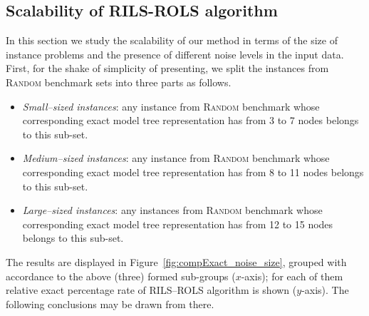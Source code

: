 \documentclass[a4paper,12pt]{elsarticle}
\begin{document}
\subsection{Scalability of \textsc{RILS}-\textsc{ROLS} algorithm}\label{sec:scalability-rils-rols}

In this section we study the scalability of our method in terms of the size of  instance problems and  the presence of different noise levels in the input data.  First, for the shake of simplicity of presenting,  we split the instances from \textsc{Random} benchmark sets into three parts as follows. 
\begin{itemize}
	\item \textit{Small--sized instances}: any instance  from \textsc{Random} benchmark whose   corresponding exact model  tree representation  has from 3 to 7 nodes belongs to this sub-set.
	\item \textit{Medium--sized instances}:  any instance  from \textsc{Random} benchmark whose   corresponding exact model tree representation  has from 8 to 11 nodes belongs to this sub-set.
	\item \textit{Large--sized instances}: any instances from \textsc{Random} benchmark whose   corresponding exact model  tree representation  has from 12 to 15 nodes belongs to this sub-set. 
\end{itemize}

The results are displayed in Figure~\ref{fig:compExact_noise_size}, grouped with accordance to the above (three) formed sub-groups ($x$-axis); for each of them relative exact percentage rate   of \textsc{RILS}--\textsc{ROLS} algorithm is shown ($y$-axis). The following conclusions may be drawn from there. 
\end{document}
